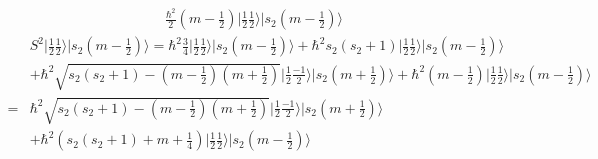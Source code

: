 \begin{enumerate}
\begin{align*}
            \frac{\hbar^2}{2}
            \left(m-\frac{1}{2}\right)
            \bigg|\frac{1}{2}\frac{1}{2}\bigg\rangle
            \bigg|s_2\left(m-\frac{1}{2}\right)\bigg\rangle
        \end{align*}
        \begin{align*}
            &S^2\bigg|\frac{1}{2}\frac{1}{2}\bigg\rangle
            \bigg|s_2\left(m-\frac{1}{2}\right)\bigg\rangle
            =\hbar^2\frac{3}{4}\bigg|\frac{1}{2}\frac{1}{2}\bigg\rangle
            \bigg|s_2\left(m-\frac{1}{2}\right)\bigg\rangle
            +
            \hbar^2s_2(s_2+1)\bigg|\frac{1}{2}\frac{1}{2}\bigg\rangle
            \bigg|s_2\left(m-\frac{1}{2}\right)\bigg\rangle\\
            &+\hbar^2\sqrt{s_2(s_2+1)-(m-\frac{1}{2})(m+\frac{1}{2})}\bigg|\frac{1}{2}\frac{-1}{2}\bigg\rangle
            \bigg|s_2\left(m+\frac{1}{2}\right)\bigg\rangle
            +
            \hbar^2
            \left(m-\frac{1}{2}\right)
            \bigg|\frac{1}{2}\frac{1}{2}\bigg\rangle
            \bigg|s_2\left(m-\frac{1}{2}\right)\bigg\rangle\\
            =&\hbar^2\sqrt{s_2(s_2+1)-(m-\frac{1}{2})(m+\frac{1}{2})}\bigg|\frac{1}{2}\frac{-1}{2}\bigg\rangle
            \bigg|s_2\left(m+\frac{1}{2}\right)\bigg\rangle\\
            &+
            \hbar^2(s_2(s_2+1)+m+\frac{1}{4})
            \bigg|\frac{1}{2}\frac{1}{2}\bigg\rangle
            \bigg|s_2\left(m-\frac{1}{2}\right)\bigg\rangle
        \end{align*}
        

\end{enumerate}
